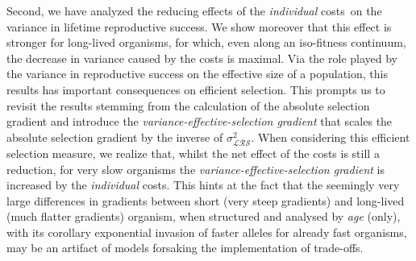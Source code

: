 \documentclass[10pt,a4paper]{article}
\newcommand{\lam}{$\lambda$}
\newcommand{\PCoR}{\emph{individual} costs}
\newcommand{\TLA}{Trait Level Analysis}
\newcommand{\vLRO}{$\sigma_{\mathrm{\mathcal{LRS}}}^2$}
\begin{document}
Second, we have analyzed the reducing effects of the \PCoR\ on the variance in lifetime reproductive success. We show moreover that this effect is stronger for long-lived organisms, for which, even along an iso-fitness continuum, the decrease in variance caused by the costs is maximal. Via the role played by the variance in reproductive success on the effective size of a population, this results has important consequences on efficient selection. This prompts us to revisit the results stemming from the calculation of the absolute selection gradient and introduce the \emph{variance-effective-selection gradient} that scales the absolute selection gradient by the inverse of \vLRO. When considering this efficient selection measure, we realize that, whilst the net effect of the costs is still a reduction, for very slow organisms the \emph{variance-effective-selection gradient} is increased by the \PCoR. This hints at the fact that the seemingly very large differences in gradients between short (very steep gradients) and long-lived (much flatter gradients) organism, when structured and analysed by \emph{age} (only), with its corollary exponential invasion of faster alleles for already fast organisms, may be an artifact of models forsaking the implementation of trade-offs. \\

\end{document}
